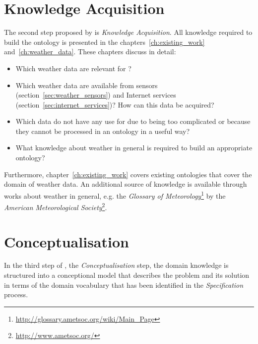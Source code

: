 \section{Knowledge Acquisition}

The second step proposed by \methontology is \emph{Knowledge Acquisition}. All knowledge required to build the \thinkhomeweather ontology is presented in the chapters~\ref{ch:existing_work} and~\ref{ch:weather_data}. These chapters discuss in detail:

\begin{itemize}
  \item Which weather data are relevant for \thinkhome?
  \item Which weather data are available from sensors (section~\ref{sec:weather_sensors}) and Internet services (section~\ref{sec:internet_services})? How can this data be acquired?
  \item Which data do not have any use for \thinkhomeweather due to being too complicated or because they cannot be processed in an ontology in a useful way?
  \item What knowledge about weather in general is required to build an appropriate ontology? %
\end{itemize}

Furthermore, chapter~\ref{ch:existing_work} covers existing ontologies that cover the domain of weather data. An additional source of knowledge is available through works about weather in general, e.g. the \emph{Glossary of Meteorology}\footnote{\href{http://glossary.ametsoc.org/wiki/Main\_Page}{http://glossary.ametsoc.org/wiki/Main\_Page}} by the \emph{American Meteorological Society}\footnote{\href{http://www.ametsoc.org/}{http://www.ametsoc.org/}}\cite{GlossaryOfMeteorology}.

\section{Conceptualisation}


In the third step of \methontology, the \emph{Conceptualisation} step, the domain knowledge is structured into a conceptional model that describes the problem and its solution in terms of the domain vocabulary that has been identified in the \emph{Specification} process.

